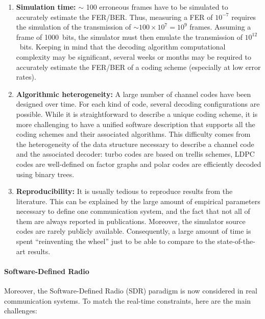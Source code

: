 \begin{enumerate}
  \item \textbf{Simulation time:}
    $\sim$ 100 erroneous frames have to be simulated to accurately estimate the
    FER/BER. Thus, measuring a FER of $10^{-7}$ requires the simulation of the
    transmission of $\sim100\times 10^7=10^9$ frames. Assuming a frame of
    1000~bits, the simulator must then emulate the transmission of
    $10^{12}$~bits. Keeping in mind that the decoding algorithm computational
    complexity may be significant, several weeks or months may be required to
    accurately estimate the FER/BER of a coding scheme (especially at low error
    rates).

  \item \textbf{Algorithmic heterogeneity:} A large number of channel codes have
    been designed over time. For each kind of code, several decoding
    configurations are possible. While it is straightforward to describe a
    unique coding scheme, it is more challenging to have a unified software
    description that supports all the coding schemes and their associated
    algorithms. This difficulty comes from the heterogeneity of the data
    structure necessary to describe a channel code and the associated decoder:
    turbo codes are based on trellis schemes, LDPC codes are well-defined on
    factor graphs and polar codes are efficiently decoded using binary trees.

  \item \textbf{Reproducibility:} It is usually tedious to reproduce results
    from the literature. This can be explained by the large amount of empirical
    parameters necessary to define one communication system, and the fact that
    not all of them are always reported in publications. Moreover, the simulator
    source codes are rarely publicly available. Consequently, a large amount of
    time is spent ``reinventing the wheel'' just to be able to compare to the
    state-of-the-art results.
\end{enumerate}

\paragraph{Software-Defined Radio}

Moreover, the Software-Defined Radio (SDR) paradigm is now considered in real
communication systems. To match the real-time constraints, here are the main
challenges:

